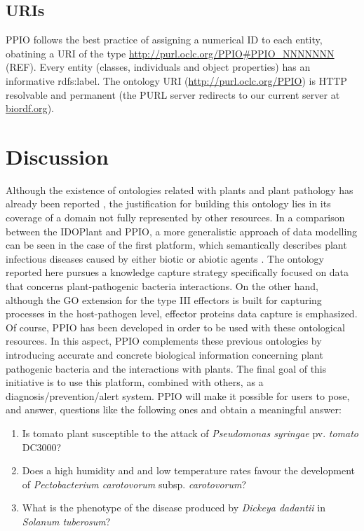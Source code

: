 \documentclass[sw]{iosart2c}
\begin{document}
\subsection{URIs}
PPIO follows the best practice of assigning a numerical ID to each entity, obatining a URI of the type \url{http://purl.oclc.org/PPIO#PPIO_NNNNNNN} (REF). Every entity (classes, individuals and object properties) has an informative rdfs:label. The ontology URI (\url{http://purl.oclc.org/PPIO}) is HTTP resolvable and permanent (the PURL server redirects to our current server at \url{biordf.org}). 




\section{Discussion}

Although the existence of ontologies related with plants and plant pathology has already been reported \cite{PTO} \cite{Lindeberg} \cite{Walls}, the justification for building this ontology lies in its coverage of a domain not fully represented by other resources. In a comparison between the IDOPlant and PPIO, a more generalistic approach of data modelling can be seen in the case of the first platform, which semantically describes plant infectious diseases caused by either biotic or abiotic agents . The ontology reported here pursues a knowledge capture strategy specifically focused on data that concerns plant-pathogenic bacteria interactions. On the other hand, although the GO extension for the type III effectors is built for capturing processes in the host-pathogen level, effector proteins data capture is emphasized. Of course, PPIO has been developed in order to be used with these ontological resources. In this aspect, PPIO complements these previous ontologies by introducing accurate and concrete biological information concerning plant pathogenic bacteria and the interactions with plants. The final goal of this initiative is to use this platform, combined with others, as a diagnosis/prevention/alert system. PPIO will make it possible for users to pose, and answer, questions like the following ones and obtain a meaningful answer:

\begin{enumerate}
\item Is tomato plant susceptible to the attack of {\itshape Pseudomonas syringae} pv. {\itshape tomato} DC3000?
\item Does a high humidity and and low temperature rates favour the development of {\itshape Pectobacterium carotovorum} subsp. {\itshape carotovorum}?
\item What is the phenotype of the disease produced by {\itshape Dickeya dadantii} in {\itshape Solanum tuberosum}?

\end{enumerate}
\end{document}
